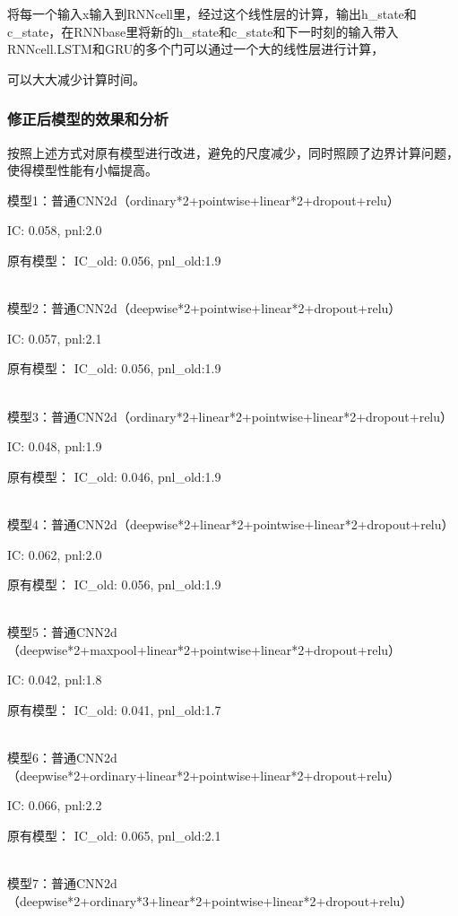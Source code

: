 \documentclass[11pt]{ctexart}
\begin{document}
将每一个输入x输入到RNNcell里，经过这个线性层的计算，输出h\_state和c\_state，在RNNbase里将新的h\_state和c\_state和下一时刻的输入带入RNNcell.LSTM和GRU的多个门可以通过一个大的线性层进行计算，\par 可以大大减少计算时间。

\subsubsection{修正后模型的效果和分析}
按照上述方式对原有模型进行改进，避免的尺度减少，同时照顾了边界计算问题，使得模型性能有小幅提高。

模型1：普通CNN2d（ordinary*2+pointwise+linear*2+dropout+relu）

{\kaishu \small IC: 0.058, pnl:2.0}

原有模型：
{\kaishu \small IC\_old: 0.056, pnl\_old:1.9}

~\\
模型2：普通CNN2d（deepwise*2+pointwise+linear*2+dropout+relu）

{\kaishu \small IC: 0.057, pnl:2.1}

原有模型：
{\kaishu \small IC\_old: 0.056, pnl\_old:1.9}

~\\
模型3：普通CNN2d（ordinary*2+linear*2+pointwise+linear*2+dropout+relu）

{\kaishu \small IC: 0.048, pnl:1.9}

原有模型：
{\kaishu \small IC\_old: 0.046, pnl\_old:1.9}

~\\
模型4：普通CNN2d（deepwise*2+linear*2+pointwise+linear*2+dropout+relu）

{\kaishu \small IC: 0.062, pnl:2.0}

原有模型：
{\kaishu \small IC\_old: 0.056, pnl\_old:1.9}

~\\
模型5：普通CNN2d（deepwise*2+maxpool+linear*2+pointwise+linear*2+dropout+relu）

{\kaishu \small IC: 0.042, pnl:1.8}

原有模型：
{\kaishu \small IC\_old: 0.041, pnl\_old:1.7}

~\\
模型6：普通CNN2d（deepwise*2+ordinary+linear*2+pointwise+linear*2+dropout+relu）

{\kaishu \small IC: 0.066, pnl:2.2}

原有模型：
{\kaishu \small IC\_old: 0.065, pnl\_old:2.1}

~\\
模型7：普通CNN2d（deepwise*2+ordinary*3+linear*2+pointwise+linear*2+dropout+relu）
\end{document}
